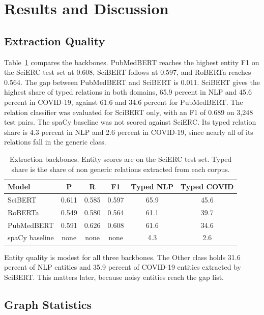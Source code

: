 \documentclass{ieeeaccess}
\begin{document}
\section{Results and Discussion}
\label{sec:results}

\subsection{Extraction Quality}

Table~\ref{tab:extraction} compares the backbones. PubMedBERT reaches the highest entity F1 on the SciERC test set at 0.608, SciBERT follows at 0.597, and RoBERTa reaches 0.564. The gap between PubMedBERT and SciBERT is 0.011. SciBERT gives the highest share of typed relations in both domains, 65.9 percent in NLP and 45.6 percent in COVID-19, against 61.6 and 34.6 percent for PubMedBERT. The relation classifier was evaluated for SciBERT only, with an F1 of 0.689 on 3,248 test pairs. The spaCy baseline was not scored against SciERC. Its typed relation share is 4.3 percent in NLP and 2.6 percent in COVID-19, since nearly all of its relations fall in the generic class.

\begin{table}[t]
\caption{Extraction backbones. Entity scores are on the SciERC test set. Typed share is the share of non generic relations extracted from each corpus.}
\label{tab:extraction}
\footnotesize
\setlength{\tabcolsep}{3pt}
\begin{tabular}{lccccc}
\toprule
Model & P & R & F1 & Typed NLP & Typed COVID \\
\midrule
SciBERT & 0.611 & 0.585 & 0.597 & 65.9 & 45.6 \\
RoBERTa & 0.549 & 0.580 & 0.564 & 61.1 & 39.7 \\
PubMedBERT & 0.591 & 0.626 & 0.608 & 61.6 & 34.6 \\
spaCy baseline & none & none & none & 4.3 & 2.6 \\
\bottomrule
\end{tabular}
\end{table}

Entity quality is modest for all three backbones. The Other class holds 31.6 percent of NLP entities and 35.9 percent of COVID-19 entities extracted by SciBERT. This matters later, because noisy entities reach the gap list.

\subsection{Graph Statistics}
\end{document}
